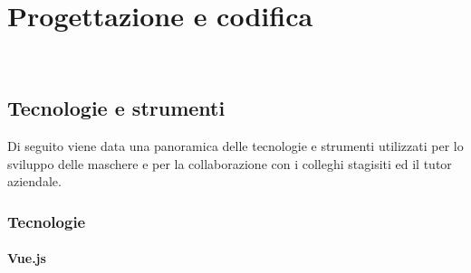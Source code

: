 
\chapter{Progettazione e codifica}
\label{cap:progettazione-codifica}

\\

\section{Tecnologie e strumenti}
\label{sec:tecnologie-strumenti}

Di seguito viene data una panoramica delle tecnologie e strumenti utilizzati per lo sviluppo delle maschere e per la collaborazione con i colleghi stagisiti ed il tutor aziendale.

\subsection{Tecnologie}
\label{subsec:tecnologie}

\subsubsection{Vue.js}
\label{subsubsec:vue.js}

